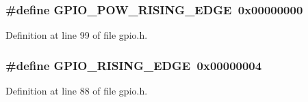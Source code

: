 \subsubsection[{\texorpdfstring{G\+P\+I\+O\+\_\+\+P\+O\+W\+\_\+\+R\+I\+S\+I\+N\+G\+\_\+\+E\+D\+GE}{GPIO_POW_RISING_EDGE}}]{\setlength{\rightskip}{0pt plus 5cm}\#define G\+P\+I\+O\+\_\+\+P\+O\+W\+\_\+\+R\+I\+S\+I\+N\+G\+\_\+\+E\+D\+GE~0x00000000}\hypertarget{_open_mote-_c_c2538_2source_2gpio_8h_a8a4bb7e2d702f6e1cd7345fe9fd6c674}{}\label{_open_mote-_c_c2538_2source_2gpio_8h_a8a4bb7e2d702f6e1cd7345fe9fd6c674}


Definition at line 99 of file gpio.\+h.

\subsubsection[{\texorpdfstring{G\+P\+I\+O\+\_\+\+R\+I\+S\+I\+N\+G\+\_\+\+E\+D\+GE}{GPIO_RISING_EDGE}}]{\setlength{\rightskip}{0pt plus 5cm}\#define G\+P\+I\+O\+\_\+\+R\+I\+S\+I\+N\+G\+\_\+\+E\+D\+GE~0x00000004}\hypertarget{_open_mote-_c_c2538_2source_2gpio_8h_ab7f1524655feb8ef492ffa61e8325ead}{}\label{_open_mote-_c_c2538_2source_2gpio_8h_ab7f1524655feb8ef492ffa61e8325ead}


Definition at line 88 of file gpio.\+h.

